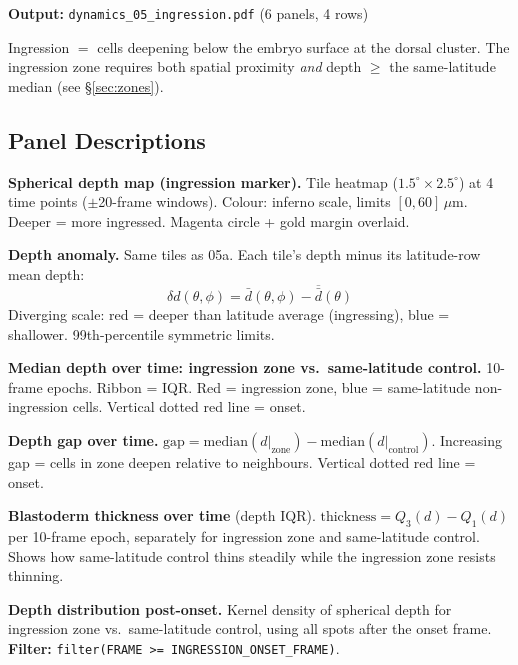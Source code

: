 \documentclass[11pt,a4paper]{article}
\newcommand{\um}{\,\mu\text{m}}
\begin{document}
\noindent\textbf{Output:} \texttt{dynamics\_05\_ingression.pdf}
(6 panels, 4 rows)

Ingression $=$ cells deepening below the embryo surface at the dorsal
cluster.  The ingression zone requires both spatial proximity \emph{and}
depth $\ge$ the same-latitude median (see \S\ref{sec:zones}).

\subsection*{Panel Descriptions}

\begin{description}[style=nextline,leftmargin=1.5cm]
  \item[05a] \textbf{Spherical depth map (ingression marker).}
    Tile heatmap ($1.5^\circ \times 2.5^\circ$) at 4 time points ($\pm$20-frame
    windows).  Colour: inferno scale, limits $[0, 60]\um$.  Deeper = more
    ingressed.  Magenta circle + gold margin overlaid.

  \item[05b] \textbf{Depth anomaly.}
    Same tiles as 05a.  Each tile's depth minus its latitude-row mean depth:
    \[
      \delta d(\theta,\phi) = \bar{d}(\theta,\phi)
        - \overline{\bar{d}}(\theta)
    \]
    Diverging scale: red = deeper than latitude average (ingressing),
    blue = shallower.  99th-percentile symmetric limits.

  \item[05c] \textbf{Median depth over time: ingression zone vs.\
    same-latitude control.}
    10-frame epochs.  Ribbon = IQR.  Red = ingression zone, blue =
    same-latitude non-ingression cells.  Vertical dotted red line = onset.

  \item[05d] \textbf{Depth gap over time.}
    $\mathrm{gap} = \mathrm{median}(d|_\mathrm{zone}) -
    \mathrm{median}(d|_\mathrm{control})$.  Increasing gap = cells in zone
    deepen relative to neighbours.  Vertical dotted red line = onset.

  \item[05e] \textbf{Blastoderm thickness over time} (depth IQR).
    $\mathrm{thickness} = Q_3(d) - Q_1(d)$ per 10-frame epoch, separately
    for ingression zone and same-latitude control.  Shows how
    same-latitude control thins steadily while the ingression zone resists
    thinning.

  \item[05f] \textbf{Depth distribution post-onset.}
    Kernel density of spherical depth for ingression zone vs.\
    same-latitude control, using all spots after the onset frame.
    \textbf{Filter:} \texttt{filter(FRAME >= INGRESSION\_ONSET\_FRAME)}.
\end{description}
\end{document}
